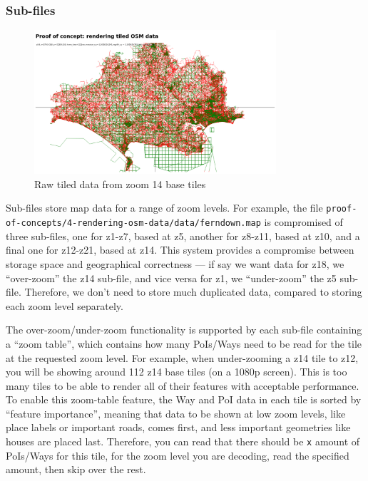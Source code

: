 \documentclass{final_report}
\begin{document}
\subsubsection{Sub-files}

\begin{figure}[ht]
    \centering
    \includegraphics[width=0.8\textwidth]{../proof-of-concepts/4-rendering-osm-data/screenshots/high-detail-at-low-zoom.png}
    \caption{Raw tiled data from zoom 14 base tiles}\label{fig:rendering-tiles}
\end{figure}


Sub-files store map data for a range of zoom levels. For example, the file \texttt{proof\--of\--concepts/4\--rendering\--osm\--data\-/data/ferndown.map} is compromised of three sub-files, one for z1-z7, based at z5, another for z8-z11, based at z10, and a final one for z12-z21, based at z14. This system provides a compromise between storage space and geographical correctness --- if say we want data for z18, we ``over-zoom'' the z14 sub-file, and vice versa for z1, we ``under-zoom'' the z5 sub-file. Therefore, we don't need to store much duplicated data, compared to storing each zoom level separately.

The over-zoom/under-zoom functionality is supported by each sub-file containing a ``zoom table'', which contains how many PoIs/Ways need to be read for the tile at the requested zoom level. For example, when under-zooming a z14 tile to z12, you will be showing around 112 z14 base tiles (on a 1080p screen). This is too many tiles to be able to render all of their features with acceptable performance. To enable this zoom-table feature, the Way and PoI data in each tile is sorted by ``feature importance'', meaning that data to be shown at low zoom levels, like place labels or important roads, comes first, and less important geometries like houses are placed last. Therefore, you can read that there should be \texttt{x} amount of PoIs/Ways for this tile, for the zoom level you are decoding, read the specified amount, then skip over the rest.
\end{document}

